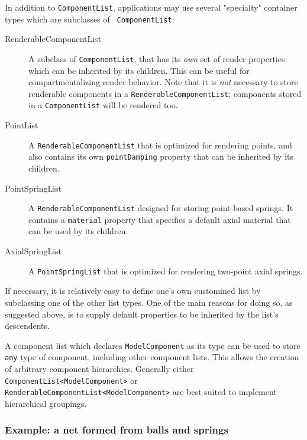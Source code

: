 In addition to {\tt ComponentList}, applications may use several
"specialty" container types which are subclasses of {\tt
ComponentList}:

\begin{description}

\item[RenderableComponentList]\mbox{}

A subclass of {\tt ComponentList}, that
has its {\it own} set of render properties which can be inherited by
its children. This can be useful for compartmentalizing render
behavior.  Note that it is {\it not} necessary to store renderable
components in a {\tt RenderableComponentList}; components stored in a
{\tt ComponentList} will be rendered too.

\item[PointList]\mbox{}

A {\tt RenderableComponentList} that is optimized for
rendering points, and also contains its own {\tt pointDamping}
property that can be inherited by its children.

\item[PointSpringList]\mbox{}

A {\tt RenderableComponentList} designed for
storing point-based springs. It contains a {\tt material} property that
specifies a default axial material that can be used by its children.

\item[AxialSpringList]\mbox{}

A {\tt PointSpringList} that is optimized for
rendering two-point axial springs.

\end{description}

If necessary, it is relatively easy to define one's own customined
list by subclassing one of the other list types. One of the main
reasons for doing so, as suggested above, is to supply default
properties to be inherited by the list's descendents.  

A component list which declares {\tt ModelComponent} as its type can
be used to store {\tt any} type of component, including other
component lists. This allows the creation of arbitrary component
hierarchies. Generally either\\
{\tt ComponentList<ModelComponent>} or 
{\tt RenderableComponentList<ModelComponent>} are
best suited to implement hierarchical groupings.

\subsubsection{Example: a net formed from balls and springs}


